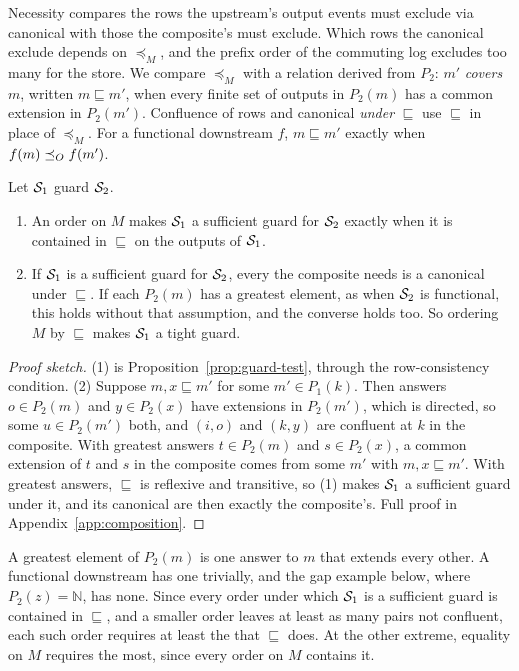 Necessity compares the rows the upstream's output events must exclude via
canonical \commitments with those the composite's must exclude.  Which rows the
canonical \commitments exclude depends on $\preceq_M$, and the prefix order of
the commuting log excludes too many for the store.  We compare
$\preceq_M$ with a relation derived from $P_2$: $m'$ \emph{covers} $m$,
written $m\sqsubseteq m'$, when every finite set of outputs in $P_2(m)$ has a
common extension in $P_2(m')$.  Confluence of rows and canonical
\commitments \emph{under} $\sqsubseteq$ use $\sqsubseteq$ in place of
$\preceq_M$.
For a functional downstream $f$, $m\sqsubseteq m'$ exactly when
$f(m)\preceq_O f(m')$.

\begin{theorem}
\label{thm:guard-tightening}
Let $\mathcal{S}_1$ guard $\mathcal{S}_2$.
\begin{enumerate}
    \item An order on $M$ makes $\mathcal{S}_1$ a sufficient guard for $\mathcal{S}_2$
        exactly when it is contained in $\sqsubseteq$ on the outputs of
        $\mathcal{S}_1$.
    \item If $\mathcal{S}_1$ is a sufficient guard for $\mathcal{S}_2$, every \commitment
        the composite needs is a canonical \commitment under $\sqsubseteq$.
        If each $P_2(m)$ has a greatest element, as when $\mathcal{S}_2$ is
        functional, this holds without that assumption, and the converse
        holds too.  So ordering $M$ by $\sqsubseteq$ makes $\mathcal{S}_1$ a tight
        guard.
\end{enumerate}
\end{theorem}

\begin{proof}[Proof sketch]
(1) is Proposition~\ref{prop:guard-test}, through the
row-consistency condition.  (2) Suppose
$m,x\sqsubseteq m'$ for some $m'\in P_1(k)$.  Then answers $o\in P_2(m)$ and
$y\in P_2(x)$ have extensions in $P_2(m')$, which is directed, so some
$u\in P_2(m')$ \outrel both, and $(i,o)$ and $(k,y)$ are confluent at $k$ in
the composite.  With
greatest answers $t\in P_2(m)$ and $s\in P_2(x)$, a common extension of $t$
and $s$ in the composite comes from some $m'$ with $m,x\sqsubseteq m'$.  With
greatest answers, $\sqsubseteq$ is reflexive and transitive, so (1) makes
$\mathcal{S}_1$ a sufficient guard under it, and its canonical \commitments are then
exactly the composite's.  Full proof in
Appendix~\ref{app:composition}.
\end{proof}

A greatest element of $P_2(m)$ is one answer to $m$ that extends every
other.  A functional downstream has one trivially, and the gap example below,
where $P_2(z)=\mathbb N$, has none.  Since every order under which $\mathcal{S}_1$ is
a sufficient guard is contained in $\sqsubseteq$, and a smaller order leaves at least as many pairs not confluent, each such order requires at least the
\commitments that $\sqsubseteq$ does.  At the other extreme, equality on $M$
requires the most, since every order on $M$ contains it.

